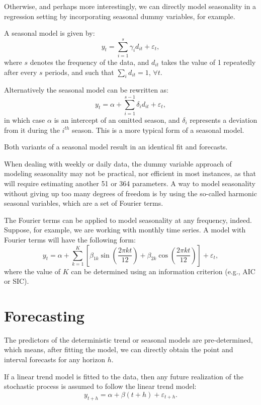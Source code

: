 \documentclass[
  12pt,
  oneside]{book}
\begin{document}
Otherwise, and perhaps more interestingly, we can directly model seasonality in a regression setting by incorporating seasonal dummy variables, for example.

A seasonal model is given by: \[y_t = \sum_{i=1}^{s}\gamma_i d_{it} + \varepsilon_t,\]
where \(s\) denotes the frequency of the data, and \(d_{it}\) takes the value of 1 repeatedly after every \(s\) periods, and such that \(\sum_{i} d_{it} = 1\), \(\forall t\).

Alternatively the seasonal model can be rewritten as: \[y_t = \alpha + \sum_{i=1}^{s-1}\delta_i d_{it} + \varepsilon_t,\] in which case \(\alpha\) is an intercept of an omitted season, and \(\delta_i\) represents a deviation from it during the \(i^{th}\) season. This is a more typical form of a seasonal model.

Both variants of a seasonal model result in an identical fit and forecasts.

When dealing with weekly or daily data, the dummy variable approach of modeling seasonality may not be practical, nor efficient in most instances, as that will require estimating another 51 or 364 parameters. A way to model seasonality without giving up too many degrees of freedom is by using the so-called harmonic seasonal variables, which are a set of Fourier terms.

The Fourier terms can be applied to model seasonality at any frequency, indeed. Suppose, for example, we are working with monthly time series. A model with Fourier terms will have the following form: \[y_t = \alpha+\sum_{k=1}^{K}\left[\beta_{1k}\sin\left(\frac{2\pi kt}{12}\right)+\beta_{2k}\cos\left(\frac{2\pi kt}{12}\right)\right]+\varepsilon_t,\] where the value of \(K\) can be determined using an information criterion (e.g., AIC or SIC).

\hypertarget{forecasting}{%
\section{Forecasting}\label{forecasting}}

The predictors of the deterministic trend or seasonal models are pre-determined, which means, after fitting the model, we can directly obtain the point and interval forecasts for any horizon \(h\).

If a linear trend model is fitted to the data, then any future realization of the stochastic process is assumed to follow the linear trend model: \[y_{t+h} = \alpha + \beta (t+h) + \varepsilon_{t+h}.\]
\end{document}
